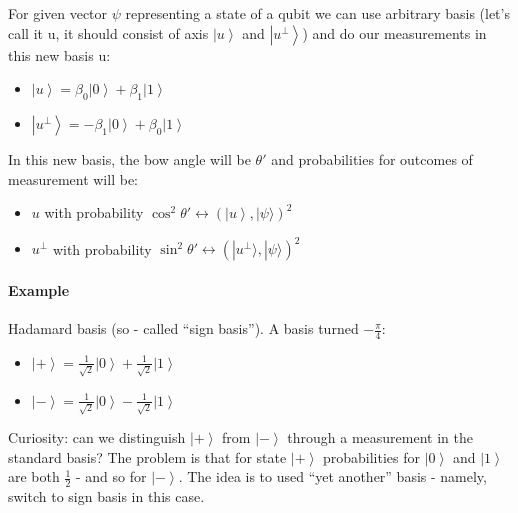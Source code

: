 \documentclass{scrartcl}
\newcommand{\ket}[1]{\left| #1 \right>} %
\begin{document}
For given vector $\psi$ representing a state of a qubit we can use arbitrary
basis (let's call it u, it should consist of axis $\ket u$ and
$\ket{u^{\perp}}$) and do our measurements in this new basis u:
\begin{itemize}
\item $\ket u = \beta_0\ket0 + \beta_1\ket1$
\item $\ket {u^{\perp}} = -\beta_1\ket0 + \beta_0\ket1$
\end{itemize}

In this new basis, the bow angle will be $\theta'$ and probabilities for
outcomes of measurement will be:
\begin{itemize}
\item $u$ with probability $\cos^2 \theta' \leftrightarrow (\ket u, |\psi
  \rangle)^2 $
\item $u^{\perp}$ with probability $\sin^2 \theta' \leftrightarrow
  (|u^{\perp}\rangle, |\psi \rangle)^2$
\end{itemize}

\paragraph{Example } Hadamard basis (so - called ``sign basis''). A basis turned
$-\frac\pi4$:
\begin{itemize}
\item $\ket+ = \frac1{\sqrt{2}} \ket0 + \frac1{\sqrt{2}} \ket1$
\item $\ket- = \frac1{\sqrt{2}} \ket0 - \frac1{\sqrt{2}} \ket1$
\end{itemize}

Curiosity: can we distinguish $\ket+$ from $\ket-$ through a measurement in the
standard basis? The problem is that for state $\ket+$ probabilities for $\ket0$
and $\ket1$ are both $\frac1{2}$ - and so for $\ket-$. The idea is to used ``yet
another'' basis - namely, switch to sign basis in this case.
\end{document}
